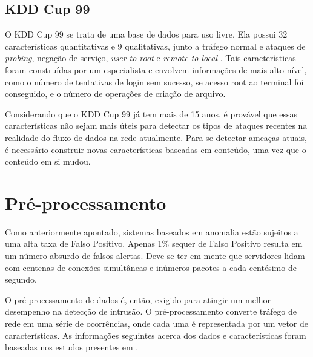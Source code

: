\subsection{KDD Cup 99}
O KDD Cup 99 se trata de uma base de dados para uso livre. Ela possui 32 características quantitativas e
9 qualitativas, junto a tráfego normal e ataques de \textit{probing}, negação de serviço, \textit{user to root} e
\textit{remote to local} \cite{zhang09}.  Tais características foram construídas por um especialista e envolvem informações de mais
alto nível, como o número de tentativas de login sem sucesso, se acesso root ao terminal foi conseguido,
e o número de operações de criação de arquivo.
\par Considerando que o KDD Cup 99 já tem mais de 15 anos, é provável que essas características não sejam mais úteis
para detectar os tipos de ataques recentes na realidade do fluxo de dados na rede atualmente. Para se detectar
ameaças atuais, é necessário construir novas características baseadas em conteúdo, uma vez que o conteúdo em si mudou.


\section{Pré-processamento}
Como anteriormente apontado, sistemas baseados em anomalia estão sujeitos a uma alta taxa de Falso Positivo. Apenas
1\% sequer de Falso Positivo resulta em um número absurdo de falsos alertas. Deve-se ter em mente que servidores lidam
com centenas de conexões simultâneas e inúmeros pacotes a cada centésimo de segundo.
\par O pré-processamento de dados é, então, exigido para atingir um melhor desempenho na detecção de intrusão.
O pré-processamento converte tráfego de rede em uma série de ocorrências, onde cada uma é representada por um vetor
de características. As informações seguintes acerca dos dados e características foram baseadas nos estudos presentes
em \cite{davis11}.

